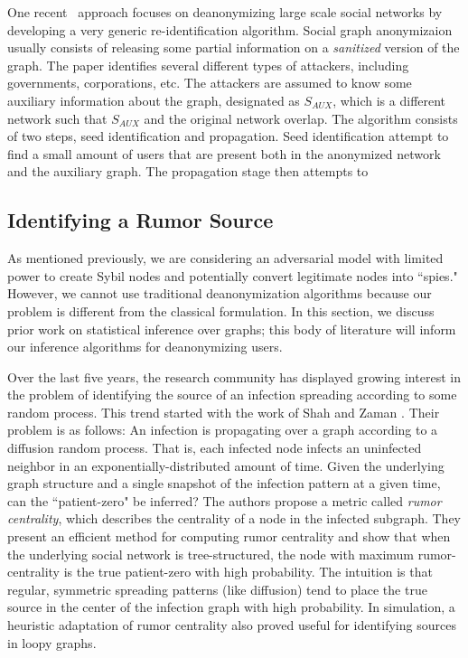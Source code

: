 \documentclass[10pt, twocolumn]{article}
\begin{document}
One recent~\cite{narayanan2009anonymizing} approach focuses on deanonymizing large scale social networks by developing a very generic re-identification algorithm. Social graph anonymizaion usually consists of releasing some partial information on a \emph{sanitized} version of the graph. 
The paper identifies several different types of attackers, including governments, corporations, etc. The attackers are assumed to know some auxiliary information about the graph, designated as $S_{AUX}$, which is a different network such that $S_{AUX}$ and the original network overlap. The algorithm consists of two steps, seed identification and propagation. Seed identification attempt to find a small amount of users that are present both in the anonymized network and the auxiliary graph. The propagation stage then attempts to 

\subsection{Identifying a Rumor Source}
As mentioned previously, we are considering an adversarial model with limited power to create Sybil nodes and potentially convert legitimate nodes into ``spies."
However, we cannot use traditional deanonymization algorithms because our problem is different from the classical formulation. 
In this section, we discuss prior work on statistical inference over graphs; this body of literature will inform our inference algorithms for deanonymizing users.

Over the last five years, the research community has displayed growing interest in the problem of identifying the source of an infection spreading according to some random process. 
This trend started with the work of Shah and Zaman \cite{shah2011rumors}. Their problem is as follows: An infection is propagating over a graph according to a diffusion random process. That is, each infected node infects an uninfected neighbor in an exponentially-distributed amount of time. Given the underlying graph structure and a single snapshot of the infection pattern at a given time, can the ``patient-zero" be inferred? The authors propose a metric called \emph{rumor centrality}, which describes the centrality of a node in the infected subgraph. They present an efficient method for computing rumor centrality and show that when the underlying social network is tree-structured, the node with maximum rumor-centrality is the true patient-zero with high probability. The intuition is that regular, symmetric spreading patterns (like diffusion) tend to place the true source in the center of the infection graph with high probability. 
In simulation, a heuristic adaptation of rumor centrality also proved useful for identifying sources in loopy graphs.
\end{document}
